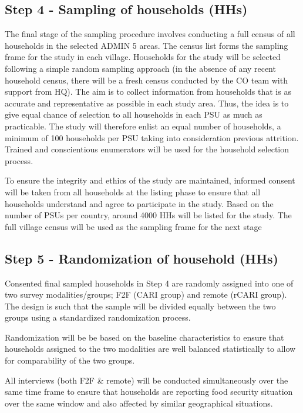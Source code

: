 \documentclass[11pt,harvard]{article}
\begin{document}
	\subsection*{Step 4 - Sampling of households (HHs)}
	The final stage of the sampling procedure involves conducting a full census of all households in the selected ADMIN 5 areas. The census list forms the sampling frame for the study in each village. Households for the study will be selected following a simple random sampling approach (in the absence of any recent household census, there will be a fresh census conducted by the CO team with support from HQ). The aim is to collect information from households that is as accurate and representative as possible in each study area. Thus, the idea is to give equal chance of selection to all households in each PSU as much as practicable. The study will therefore enlist an equal number of households, a minimum of 100 households per PSU taking into consideration previous attrition. Trained and conscientious enumerators will be used for the household selection process.
		
	To ensure the integrity and ethics of the study are maintained, informed consent will be taken from all households at the listing phase to ensure that all households understand and agree to participate in the study. Based on the number of PSUs per country, around 4000 HHs will be listed for the study. The full village census will be used as the sampling frame for the next stage	
	
	\subsection*{Step 5 - Randomization of household (HHs)}
	Consented final sampled households in Step 4 are randomly assigned into one of two survey modalities/groups; F2F (CARI group) and remote (rCARI group). The design is such that the sample will be divided equally between the two groups using a standardized randomization process. 
	
	Randomization will be be based on the baseline characteristics to ensure that households assigned to the two modalities are well balanced statistically to allow for comparability of the two groups.
	
	All interviews (both F2F \& remote) will be conducted simultaneously over the same time frame to ensure that households are reporting food security situation over the same window and also affected by similar geographical situations.
	
\end{document}

